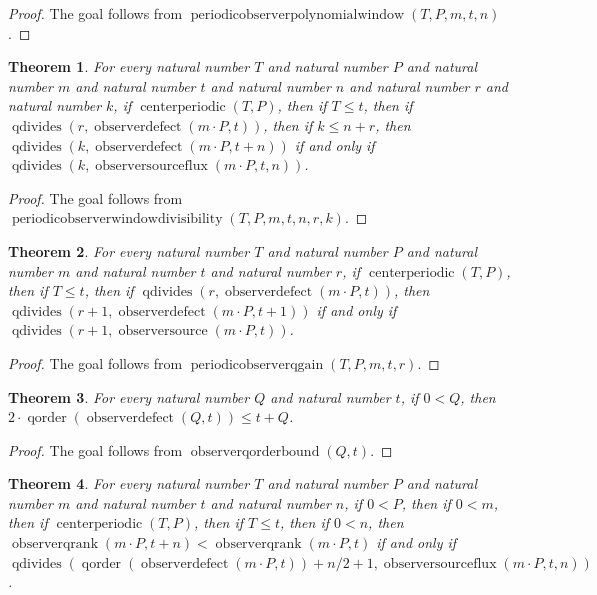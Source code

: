\documentclass[11pt]{article}
\newtheorem{theorem}{Theorem}[section]
\theoremstyle{definition}
\begin{document}
\begin{proof}
The goal follows from \(\operatorname{periodicobserverpolynomialwindow}(T, P, m, t, n)\).
\end{proof}
\begin{theorem}
\label{ll:observations:periodic-observer-window-divisibility}
For every natural number \(T\) and natural number \(P\) and natural number \(m\) and natural number \(t\) and natural number \(n\) and natural number \(r\) and natural number \(k\), if \(\operatorname{centerperiodic}(T, P)\), then if \(T \le t\), then if \(\operatorname{qdivides}(r, \operatorname{observerdefect}(m \cdot P, t))\), then if \(k \le n + r\), then \(\operatorname{qdivides}(k, \operatorname{observerdefect}(m \cdot P, t + n))\) if and only if \(\operatorname{qdivides}(k, \operatorname{observersourceflux}(m \cdot P, t, n))\).
\end{theorem}
\begin{proof}
The goal follows from \(\operatorname{periodicobserverwindowdivisibility}(T, P, m, t, n, r, k)\).
\end{proof}
\begin{theorem}
\label{ll:observations:periodic-observer-q-gain}
For every natural number \(T\) and natural number \(P\) and natural number \(m\) and natural number \(t\) and natural number \(r\), if \(\operatorname{centerperiodic}(T, P)\), then if \(T \le t\), then if \(\operatorname{qdivides}(r, \operatorname{observerdefect}(m \cdot P, t))\), then \(\operatorname{qdivides}(r + 1, \operatorname{observerdefect}(m \cdot P, t + 1))\) if and only if \(\operatorname{qdivides}(r + 1, \operatorname{observersource}(m \cdot P, t))\).
\end{theorem}
\begin{proof}
The goal follows from \(\operatorname{periodicobserverqgain}(T, P, m, t, r)\).
\end{proof}
\begin{theorem}
\label{ll:observations:observer-q-order-bound}
For every natural number \(Q\) and natural number \(t\), if \(0 < Q\), then \(2 \cdot \operatorname{qorder}(\operatorname{observerdefect}(Q, t)) \le t + Q\).
\end{theorem}
\begin{proof}
The goal follows from \(\operatorname{observerqorderbound}(Q, t)\).
\end{proof}
\begin{theorem}
\label{ll:observations:periodic-observer-q-rank-drop}
For every natural number \(T\) and natural number \(P\) and natural number \(m\) and natural number \(t\) and natural number \(n\), if \(0 < P\), then if \(0 < m\), then if \(\operatorname{centerperiodic}(T, P)\), then if \(T \le t\), then if \(0 < n\), then \(\operatorname{observerqrank}(m \cdot P, t + n) < \operatorname{observerqrank}(m \cdot P, t)\) if and only if \(\operatorname{qdivides}(\operatorname{qorder}(\operatorname{observerdefect}(m \cdot P, t)) + n / 2 + 1, \operatorname{observersourceflux}(m \cdot P, t, n))\).
\end{theorem}
\end{document}
